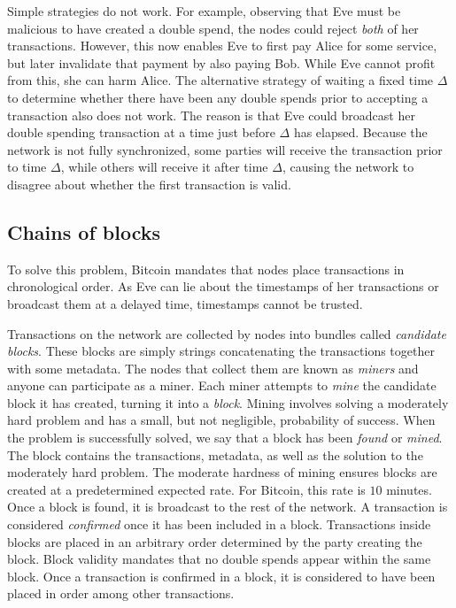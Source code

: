 Simple strategies do not work. For example, observing that Eve must be malicious
to have created a double spend, the nodes could reject \emph{both} of her
transactions. However, this now enables Eve to first pay Alice for some service,
but later invalidate that payment by also paying Bob. While Eve cannot profit
from this, she can harm Alice. The alternative strategy of waiting a fixed time
$\Delta$ to determine whether there have been any double spends prior to
accepting a transaction also does not work. The reason is that Eve could
broadcast her double spending transaction at a time just before $\Delta$ has
elapsed. Because the network is not fully synchronized, some parties will
receive the transaction prior to time $\Delta$, while others will receive it
after time $\Delta$, causing the network to disagree about whether the first
transaction is valid.

\subsection{Chains of blocks}
To solve this problem, Bitcoin mandates that nodes place transactions in chronological
order. As Eve can lie about the timestamps of her transactions or broadcast them at a
delayed time, timestamps cannot be trusted.

Transactions on the network are collected by nodes into bundles called
\emph{candidate blocks}. These blocks are simply strings concatenating the
transactions together with some metadata. The nodes that collect them are known
as \emph{miners} and anyone can participate as a miner. Each miner attempts to
\emph{mine} the candidate block it has created, turning it into a \emph{block}.
Mining involves solving a moderately hard problem and has a small, but not
negligible, probability of success. When the problem is successfully solved, we
say that a block has been \emph{found} or \emph{mined}. The block contains the
transactions, metadata, as well as the solution to the moderately hard problem.
The moderate hardness of mining ensures blocks are created at a predetermined
expected rate. For Bitcoin, this rate is $10$ minutes. Once a block is found, it
is broadcast to the rest of the network. A transaction is considered
\emph{confirmed} once it has been included in a block. Transactions inside
blocks are placed in an arbitrary order determined by the party creating the
block. Block validity mandates that no double spends appear within the same
block. Once a transaction is confirmed in a block, it is considered to have been
placed in order among other transactions.

